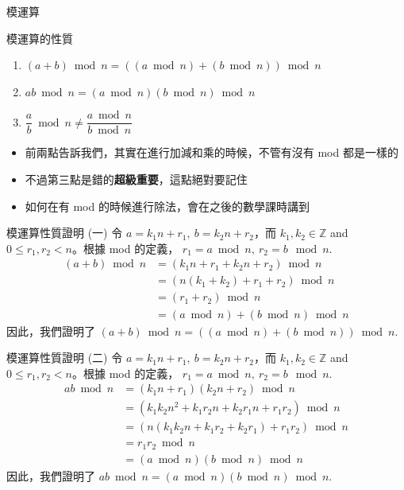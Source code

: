 \documentclass[aspectratio=169]{beamer}
\begin{document}
    \begin{frame}{模運算}
        \begin{alertblock}{模運算的性質}
            \begin{enumerate}
                \item $(a + b) \bmod n = ((a \bmod n) + (b \bmod n))\bmod n$
                \item $ab \bmod n = (a \bmod n) (b \bmod n) \bmod n$
                \item $\dfrac{a}{b} \bmod n \ne \dfrac{a \bmod n}{b \bmod n}$
            \end{enumerate}
        \end{alertblock}
        \begin{itemize}
            \item 前兩點告訴我們，其實在進行加減和乘的時候，不管有沒有 mod 都是一樣的
            \item 不過第三點是錯的\textbf{超級重要}，這點絕對要記住
            \item 如何在有 mod 的時候進行除法，會在之後的數學課時講到
        \end{itemize}
    \end{frame}
    
    \begin{frame}{模運算性質證明 (一)}
        令 $a = k_1n + r_1, \ b = k_2n + r_2$，而 $k_1,k_2 \in \mathbb{Z}$ and $0 \le r_1,r_2 < n$。根據 mod 的定義， $r_1 = a \bmod n, \ r_2 = b \mod n$.
        \begin{align*}
        (a+b) \bmod n &= (k_1n+r_1 + k_2n+r_2) \bmod n \\
                      &= (n(k_1+k_2) + r_1 + r_2) \bmod n \\
                      &= (r_1 + r_2) \bmod n \\
                      &= (a \bmod n) + (b \bmod n) \bmod n
        \end{align*}
        因此，我們證明了 $(a + b) \bmod n = ((a \bmod n) + (b \bmod n))\bmod n$.
    \end{frame}
    
    \begin{frame}{模運算性質證明 (二)}
        令 $a = k_1n + r_1, \ b = k_2n + r_2$，而 $k_1,k_2 \in \mathbb{Z}$ and $0 \le r_1,r_2 < n$。根據 mod 的定義， $r_1 = a \bmod n, \ r_2 = b \mod n$.
        \begin{align*}
        ab \bmod n  &= (k_1n+r_1)(k_2n+r_2) \bmod n \\
                    &= (k_1k_2n^2 + k_1r_2n + k_2r_1n + r_1r_2) \bmod n \\
                    &= (n(k_1k_2n + k_1r_2 + k_2r_1) + r_1r_2) \bmod n \\
                    &= r_1r_2\bmod n \\
                    &= (a \bmod n)(b \bmod n) \bmod n
        \end{align*}
        因此，我們證明了 $ab \bmod n = (a \bmod n)(b \bmod n) \bmod n$.
    \end{frame}
    
\end{document}
